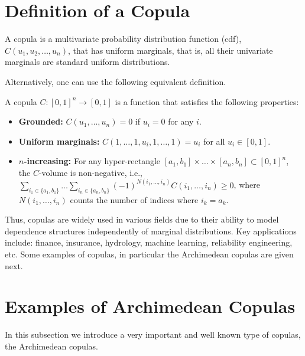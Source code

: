 \documentclass[
	11pt, %
	fleqn, %
	a4paper, %
]{LegrandOrangeBook}
\begin{document}
\section{Definition of a Copula}
\begin{definition}
\label{def:copula}
A copula is a multivariate probability distribution function (cdf), $C(u_1,u_2,\ldots,u_n)$, that has uniform marginals, that is, all their univariate marginals are standard uniform distributions.
\end{definition}
Alternatively, one can use the following equivalent definition.

\begin{definition}
\label{def:copula_alternative}
 A copula $C : [0,1]^n \to [0,1]$ is a function that satisfies the following properties:
\begin{itemize}
\item \textbf{Grounded:} $C(u_1,\ldots,u_n) = 0$ if $u_i = 0$ for any $i$.
\item \textbf{Uniform marginals:} $C(1,\ldots,1,u_i,1,\ldots,1) = u_i$ for all $u_i \in [0,1]$.
\item \textbf{$n$-increasing:} For any hyper-rectangle $[a_1,b_1] \times \ldots \times [a_n,b_n] \subset [0,1]^n$, the $C$-volume is non-negative, i.e., $\sum_{i_1 \in \{a_1, b_1\}} \ldots \sum_{i_n \in \{a_n, b_n\}} (-1)^{N(i_1, \ldots, i_n)} C(i_1, \ldots, i_n) \geq 0$, where $N(i_1, \ldots, i_n)$ counts the number of indices where $i_k = a_k$.
\end{itemize}
\end{definition}

Thus, copulas are widely used in various fields due to their ability to model dependence structures independently of marginal distributions. Key applications include: finance, insurance, hydrology, machine learning, reliability engineering, etc. Some examples of copulas, in particular the Archimedean copulas are given next.

\section{Examples of Archimedean Copulas}
\label{app:archimedeanexamples}
In this subsection we introduce a very important and well known type of copulas, the Archimedean copulas.
\end{document}
